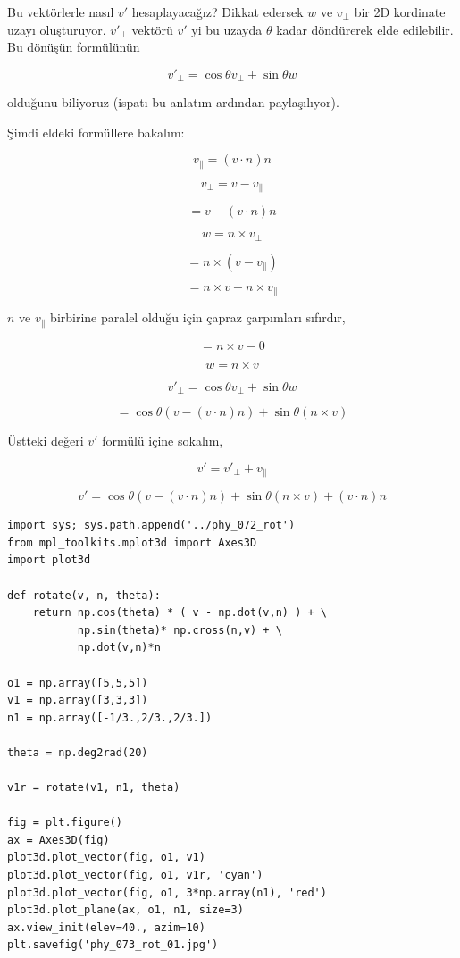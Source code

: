 \documentclass[12pt,fleqn]{article}\usepackage{../../common}
\begin{document}
Bu vektörlerle nasıl $v'$ hesaplayacağız? Dikkat edersek $w$ ve $v_\perp$ bir 2D
kordinate uzayı oluşturuyor. $v'_\perp$ vektörü $v'$ yi bu uzayda $\theta$ kadar
döndürerek elde edilebilir. Bu dönüşün formülünün

$$
v'_\perp = \cos \theta v_\perp + \sin \theta w
$$

olduğunu biliyoruz (ispatı bu anlatım ardından paylaşılıyor).

Şimdi eldeki formüllere bakalım:

$$
v_\parallel = (v \cdot n) n
$$

$$
v_\perp = v - v_\parallel
$$

$$
= v - (v \cdot n) n
$$

$$
w = n \times v_\perp
$$

$$
= n \times (v - v_\parallel)
$$

$$
= n \times v - n \times v_\parallel
$$

$n$ ve $v_\parallel$ birbirine paralel olduğu için çapraz çarpımları sıfırdır,

$$
= n \times v - 0 
$$

$$
w = n \times v
$$

$$
v'_\perp = \cos \theta v_\perp + \sin \theta w
$$

$$
= \cos \theta (v - (v \cdot n) n) + \sin \theta (n \times v)
$$

Üstteki değeri $v'$ formülü içine sokalım,

$$
v' = v'_\perp + v_\parallel
$$

$$
v' = \cos \theta (v - (v \cdot n) n) + \sin \theta (n \times v) + (v \cdot n) n
$$

\begin{verbatim}
import sys; sys.path.append('../phy_072_rot')
from mpl_toolkits.mplot3d import Axes3D
import plot3d

def rotate(v, n, theta):
    return np.cos(theta) * ( v - np.dot(v,n) ) + \
           np.sin(theta)* np.cross(n,v) + \
           np.dot(v,n)*n
 
o1 = np.array([5,5,5])
v1 = np.array([3,3,3])
n1 = np.array([-1/3.,2/3.,2/3.])

theta = np.deg2rad(20)

v1r = rotate(v1, n1, theta)

fig = plt.figure()
ax = Axes3D(fig)
plot3d.plot_vector(fig, o1, v1)
plot3d.plot_vector(fig, o1, v1r, 'cyan')
plot3d.plot_vector(fig, o1, 3*np.array(n1), 'red')
plot3d.plot_plane(ax, o1, n1, size=3)
ax.view_init(elev=40., azim=10)
plt.savefig('phy_073_rot_01.jpg')
\end{verbatim}
\end{document}
